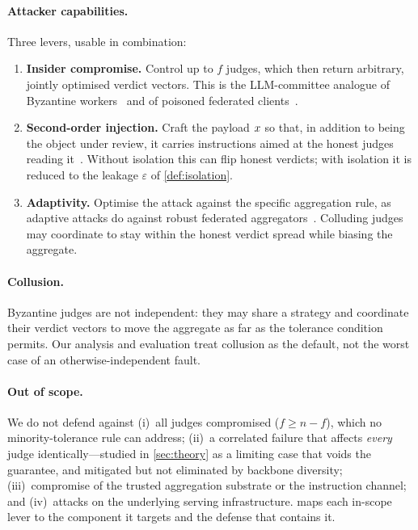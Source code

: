 \paragraph{Attacker capabilities.}
Three levers, usable in combination:
\begin{enumerate}[leftmargin=1.6em,itemsep=1pt,topsep=2pt]
  \item \textbf{Insider compromise.} Control up to $f$ judges, which then return
        arbitrary, jointly optimised verdict vectors. This is the LLM-committee analogue
        of Byzantine workers~\cite{blanchard2017krum} and of poisoned federated
        clients~\cite{bagdasaryan2020backdoor,fang2020poisoning}.
  \item \textbf{Second-order injection.} Craft the payload $x$ so that, in addition to
        being the object under review, it carries instructions aimed at the honest judges
        reading it~\cite{shi2024judgeinjection,greshake2023injection}. Without isolation
        this can flip honest verdicts; with isolation it is reduced to the leakage
        $\varepsilon$ of \cref{def:isolation}.
  \item \textbf{Adaptivity.} Optimise the attack against the specific aggregation rule,
        as adaptive attacks do against robust federated
        aggregators~\cite{fang2020poisoning,baruch2019little,xie2019fall}. Colluding
        judges may coordinate to stay within the honest verdict spread while biasing the
        aggregate.
\end{enumerate}

\paragraph{Collusion.}
Byzantine judges are not independent: they may share a strategy and coordinate their
verdict vectors to move the aggregate as far as the tolerance condition permits. Our
analysis and evaluation treat collusion as the default, not the worst case of an
otherwise-independent fault.

\paragraph{Out of scope.}
We do not defend against (i)~all judges compromised ($f\ge n-f$), which no
minority-tolerance rule can address; (ii)~a correlated failure that affects \emph{every}
judge identically—studied in \cref{sec:theory} as a limiting case that voids the
guarantee, and mitigated but not eliminated by backbone diversity; (iii)~compromise of
the trusted aggregation substrate or the instruction channel; and (iv)~attacks on the
underlying serving infrastructure.  maps each in-scope lever to the
component it targets and the defense that contains it.



